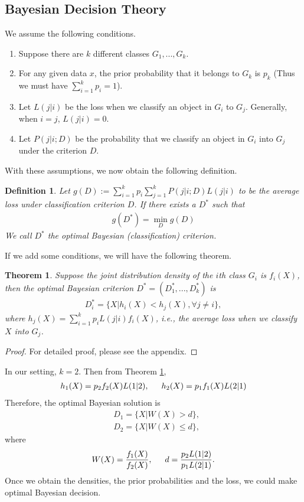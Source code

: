 \documentclass[english]{article}
\newenvironment{eqt}{\begin{equation}\begin{aligned}}{\end{aligned}\end{equation}}
\newtheorem{defn}{Definition}[section]
\newtheorem{thm}{Theorem}[section]
\begin{document}
\subsection{Bayesian Decision Theory}
\par
We assume the following conditions.
\begin{enumerate}
\item Suppose there are $k$ different classes $G_1, ..., G_k$. 
\item For any given data $x$, the prior probability that it belongs to $G_k$ is $p_k$ (Thus we must have $\sum_{i=1}^kp_i=1$). 
\item Let $L(j|i)$ be the loss when we classify an object in $G_i$ to $G_j$. Generally, when $i=j$, $L(j|i) = 0$.
\item Let $P(j|i;D)$ be the probability that we classify an object in $G_i$ into $G_j$ under the criterion $D$.
\end{enumerate}
\par
With these assumptions, we now obtain the following definition.

\begin{defn}
Let $g(D) := \sum_{i=1}^kp_i\sum_{j=1}^kP(j|i;D)L(j|i)$ to be the average loss under classification criterion $D$. If there exists a $D^*$ such that
\begin{eqt}
g(D^*) = \min_Dg(D)
\end{eqt}
We call $D^*$ the optimal Bayesian (classification) criterion.
\end{defn}
If we add some conditions, we will have the following theorem.
\begin{thm}
\label{optbayes}
Suppose the joint distribution density of the $i$th class $G_i$ is $f_i(X)$, then the optimal Bayesian criterion $D^*=(D_1^*, ..., D_k^*)$ is
\begin{eqt}
\label{optbayescrit}
D_i^* = \{X|h_i(X)<h_j(X), \forall j\neq i\},
\end{eqt}
where $h_j(X) = \sum_{i=1}^kp_iL(j|i)f_i(X)$, i.e., the average loss when we classify $X$ into $G_j$.
\end{thm}
\begin{proof}
For detailed proof, please see the appendix.
\end{proof}
\par
In our setting, $k=2$. Then from Theorem \ref{optbayes},
\begin{eqt}
h_1(X) = p_2f_2(X)L(1|2),\indent h_2(X) = p_1f_1(X)L(2|1)
\end{eqt}
Therefore, the optimal Bayesian solution is 
\begin{eqt}
&D_1 = \{X|W(X)>d\}, \\
&D_2 = \{X|W(X)\leqslant d\},
\end{eqt}
where
\begin{eqt}
\label{param}
W(X) = \frac{f_1(X)}{f_2(X)},\indent d = \frac{p_2L(1|2)}{p_1L(2|1)}.
\end{eqt}
Once we obtain the densities, the prior probabilities and the loss, we could make optimal Bayesian decision.
\end{document}
